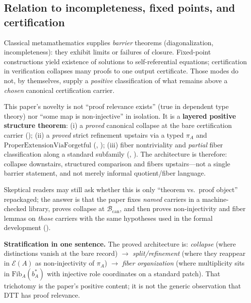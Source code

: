 \documentclass[11pt]{article}
\begin{document}
\subsection{Relation to incompleteness, fixed points, and certification}\label{sec:intro-comparison}
Classical metamathematics supplies \emph{barrier} theorems (diagonalization, incompleteness): they exhibit limits or failures of closure. Fixed-point constructions yield existence of solutions to self-referential equations; certification in verification collapses many proofs to one output certificate. Those modes do not, by themselves, supply a \emph{positive} classification of what remains above a \emph{chosen} canonical certification carrier.

This paper's novelty is not ``proof relevance exists'' (true in dependent type theory) nor ``some map is non-injective'' in isolation. It is a \textbf{layered positive structure theorem}: (i) a \emph{proved} canonical collapse at the bare certification carrier (); (ii) a \emph{proved} strict refinement upstairs via a typed $\pi_A$ and $\mathrm{ProperExtensionViaForgetful}$ (, ); (iii) fiber nontriviality and \emph{partial} fiber classification along a standard subfamily (, ). The architecture is therefore: collapse downstairs, structured comparison and fibers upstairs---not a single barrier statement, and not merely informal quotient/fiber language.

Skeptical readers may still ask whether this is only ``theorem vs.\ proof object'' repackaged; the answer is that the paper fixes \emph{named} carriers in a machine-checked library, proves collapse at $\mathcal{B}_{\mathrm{can}}$, and then proves non-injectivity and fiber lemmas on \emph{those} carriers with the same hypotheses used in the formal development ().

\smallskip
\noindent\textbf{Stratification in one sentence.} The proved architecture is: \emph{collapse} (where distinctions vanish at the bare record) $\to$ \emph{split/refinement} (where they reappear in $\mathcal{E}(A)$ as non-injectivity of $\pi_A$) $\to$ \emph{fiber organization} (where multiplicity sits in $\mathrm{Fib}_A(b^\ast_A)$ with injective role coordinates on a standard patch). That trichotomy is the paper's positive content; it is not the generic observation that DTT has proof relevance.
\end{document}
